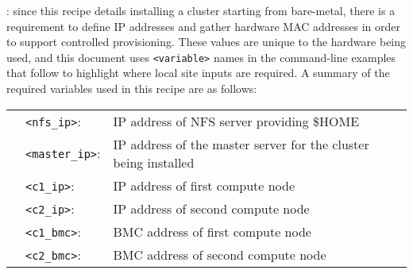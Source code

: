 : since this recipe details installing a cluster
starting from bare-metal, there is a requirement to define IP addresses and gather
hardware MAC addresses in order to support controlled provisioning. These values
are unique to the hardware being used, and this document uses \texttt{<variable>}
names in the command-line examples that follow to highlight where local site
inputs are required. A summary of the required variables used in this recipe
are as follows:

\vspace*{0.2cm}
\begin{tabular}{@{}>{\textbullet}cll@{}}
& \texttt{<nfs\_ip>}:    & IP address of NFS server providing \$HOME \\
& \texttt{<master\_ip>}: & IP address of the master server for the cluster
  being installed\\
& \texttt{<c1\_ip>}:     & IP address of first compute node \\
& \texttt{<c2\_ip>}:     & IP address of second compute node \\
& \texttt{<c1\_bmc>}:    & BMC address of first compute node \\
& \texttt{<c2\_bmc>}:    & BMC address of second compute node \\
\end{tabular}
